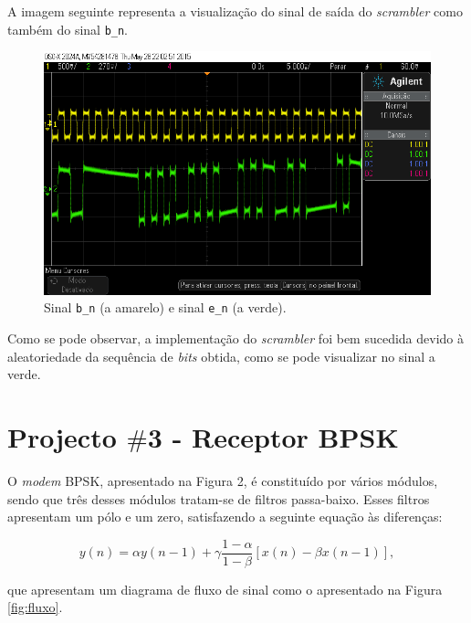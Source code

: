 \documentclass[11pt]{article}
\numberwithin{equation}{section}
\begin{document}
A imagem seguinte representa a visualização do sinal de saída do \textit{scrambler} como também do sinal \texttt{b\_n}.

\begin{figure}[H]
	\centering
	\includegraphics[keepaspectratio=true, scale=0.40]{exps/ScramblerBnVsEn}
	\caption{Sinal \texttt{b\_n} (a amarelo) e sinal \texttt{e\_n} (a verde).}
	\vspace{-0.8em}
\end{figure}

Como se pode observar, a implementação do \textit{scrambler} foi bem sucedida devido à aleatoriedade da sequência de \textit{bits} obtida, como se pode visualizar no sinal a verde. 

\pagebreak

\section{Projecto $\#$3 - Receptor BPSK}



O \textit{modem} BPSK, apresentado na Figura 2, é constituído por vários módulos, sendo que três desses módulos tratam-se de filtros passa-baixo. Esses filtros apresentam um pólo e um zero, satisfazendo a seguinte equação às diferenças:

\vspace{-3mm}
\begin{equation}
y(n) = \alpha y(n-1) + \gamma \frac{1-\alpha}{1-\beta}[x(n)-\beta x(n-1)],
\end{equation} 

\vspace{1mm}
que apresentam um diagrama de fluxo de sinal como o apresentado na Figura \ref{fig:fluxo}.
\end{document}
